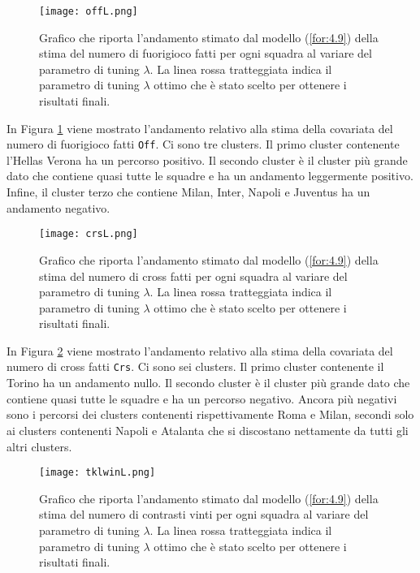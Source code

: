 \begin{figure}[htbp]
	\begin{center}
		\texttt{[image: offL.png]}
		\caption{Grafico che riporta l'andamento stimato dal modello (\ref{for:4.9}) della stima del numero di fuorigioco fatti per ogni squadra al variare del parametro di tuning $\lambda$. La linea rossa tratteggiata indica il parametro di tuning $\lambda$ ottimo che è stato scelto per ottenere i risultati finali.} \label{fig:offL}
	\end{center}
\end{figure}

In Figura \ref{fig:offL} viene mostrato l'andamento relativo alla stima della covariata del numero di fuorigioco fatti \texttt{Off}. Ci sono tre clusters. Il primo cluster contenente l'Hellas Verona ha un percorso positivo. Il secondo cluster è il cluster più grande dato che contiene quasi tutte le squadre e ha un andamento leggermente positivo. Infine, il cluster terzo che contiene Milan, Inter, Napoli e Juventus ha un andamento negativo.

\begin{figure}[htbp]
	\begin{center}
		\texttt{[image: crsL.png]}
		\caption{Grafico che riporta l'andamento stimato dal modello (\ref{for:4.9}) della stima del numero di cross fatti per ogni squadra al variare del parametro di tuning $\lambda$. La linea rossa tratteggiata indica il parametro di tuning $\lambda$ ottimo che è stato scelto per ottenere i risultati finali.} \label{fig:crsL}
	\end{center}
\end{figure}

In Figura \ref{fig:crsL} viene mostrato l'andamento relativo alla stima della covariata del numero di cross fatti \texttt{Crs}. Ci sono sei clusters. Il primo cluster contenente il Torino ha un andamento nullo. Il secondo cluster è il cluster più grande dato che contiene quasi tutte le squadre e ha un percorso negativo. Ancora più negativi sono i percorsi dei clusters contenenti rispettivamente Roma e Milan, secondi solo ai clusters contenenti Napoli e Atalanta che si discostano nettamente da tutti gli altri clusters.

\begin{figure}[htbp]
	\begin{center}
		\texttt{[image: tklwinL.png]}
		\caption{Grafico che riporta l'andamento stimato dal modello (\ref{for:4.9}) della stima del numero di contrasti vinti per ogni squadra al variare del parametro di tuning $\lambda$. La linea rossa tratteggiata indica il parametro di tuning $\lambda$ ottimo che è stato scelto per ottenere i risultati finali.} \label{fig:tklwinL}
	\end{center}
\end{figure}

